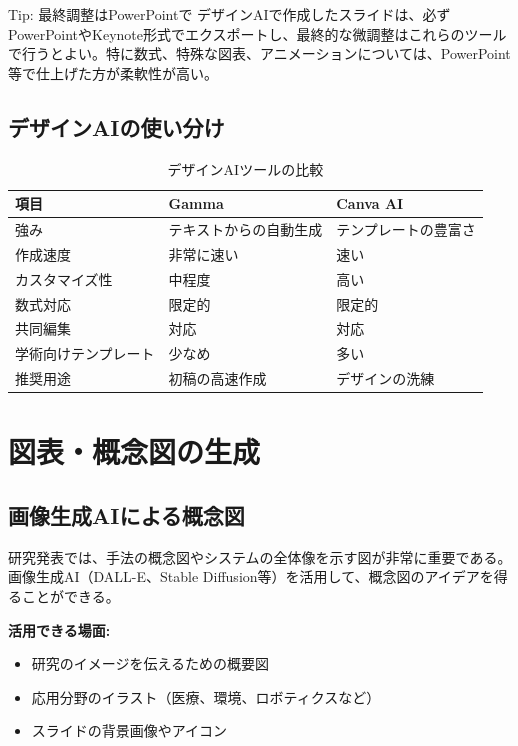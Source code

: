 \begin{itembox}[l]{Tip: 最終調整はPowerPointで}
デザインAIで作成したスライドは、必ずPowerPointやKeynote形式でエクスポートし、最終的な微調整はこれらのツールで行うとよい。特に数式、特殊な図表、アニメーションについては、PowerPoint等で仕上げた方が柔軟性が高い。
\end{itembox}

\subsection{デザインAIの使い分け}

\begin{table}[htbp]
\centering
\caption{デザインAIツールの比較}
\label{tab:design-ai-comparison}
\begin{tabular}{lll}
\toprule
項目 & Gamma & Canva AI \\
\midrule
強み & テキストからの自動生成 & テンプレートの豊富さ \\
作成速度 & 非常に速い & 速い \\
カスタマイズ性 & 中程度 & 高い \\
数式対応 & 限定的 & 限定的 \\
共同編集 & 対応 & 対応 \\
学術向けテンプレート & 少なめ & 多い \\
推奨用途 & 初稿の高速作成 & デザインの洗練 \\
\bottomrule
\end{tabular}
\end{table}

\section{図表・概念図の生成}
\label{sec:5.5}

\subsection{画像生成AIによる概念図}

研究発表では、手法の概念図やシステムの全体像を示す図が非常に重要である。画像生成AI（DALL-E、Stable Diffusion等）を活用して、概念図のアイデアを得ることができる。

\textbf{活用できる場面:}

\begin{itemize}
\item 研究のイメージを伝えるための概要図
\item 応用分野のイラスト（医療、環境、ロボティクスなど）
\item スライドの背景画像やアイコン
\end{itemize}

